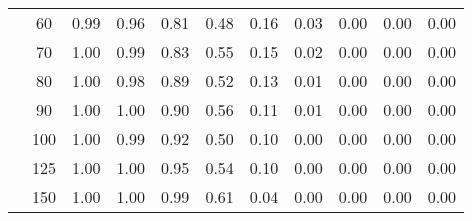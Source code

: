 \begin{table}[t]
\begin{center}
\begin{subtable}[c]{\textwidth}
\begin{center}
\begin{tabular}{rcccccccccc}
                                        & \multicolumn{1}{c|}{60}  & \num{0.99}  & \num{0.96}  & \num{0.81}  & \num{0.48}  & \num{0.16}  & \num{0.03}  & \num{0.00}  & \num{0.00}  & \num{0.00}  \\
                                        & \multicolumn{1}{c|}{70}  & \num{1.00}  & \num{0.99}  & \num{0.83}  & \num{0.55}  & \num{0.15}  & \num{0.02}  & \num{0.00}  & \num{0.00}  & \num{0.00}  \\
                                        & \multicolumn{1}{c|}{80}  & \num{1.00}  & \num{0.98}  & \num{0.89}  & \num{0.52}  & \num{0.13}  & \num{0.01}  & \num{0.00}  & \num{0.00}  & \num{0.00}  \\
                                        & \multicolumn{1}{c|}{90}  & \num{1.00}  & \num{1.00}  & \num{0.90}  & \num{0.56}  & \num{0.11}  & \num{0.01}  & \num{0.00}  & \num{0.00}  & \num{0.00}  \\
                                        & \multicolumn{1}{c|}{100}  & \num{1.00}  & \num{0.99}  & \num{0.92}  & \num{0.50}  & \num{0.10}  & \num{0.00}  & \num{0.00}  & \num{0.00}  & \num{0.00}  \\
                                        & \multicolumn{1}{c|}{125}  & \num{1.00}  & \num{1.00}  & \num{0.95}  & \num{0.54}  & \num{0.10}  & \num{0.00}  & \num{0.00}  & \num{0.00}  & \num{0.00}  \\
                                        & \multicolumn{1}{c|}{150}  & \num{1.00}  & \num{1.00}  & \num{0.99}  & \num{0.61}  & \num{0.04}  & \num{0.00}  & \num{0.00}  & \num{0.00}  & \num{0.00}  \\
                                    \end{tabular}
            \end{center}
        \end{subtable}

        \vspace{5mm}


\end{center}
\end{table}
